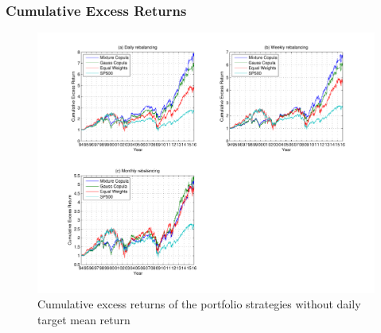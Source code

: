 \documentclass[pdf,9pt,xcolor=dvipsnames,hide notes]{beamer}
\begin{document}
%	
%		
%		
%		
%		
%		
%	

\begin{frame}[label=frame10]
\frametitle{Cumulative Excess Returns}

\begin{figure}[htbp]
\centering
\includegraphics[scale=0.3]{fig1_rpwcop.pdf}
\caption{\scriptsize Cumulative excess returns of the portfolio strategies without daily target mean return }
\label{fig:fig01}
\end{figure}

\end{frame}
\end{document}
